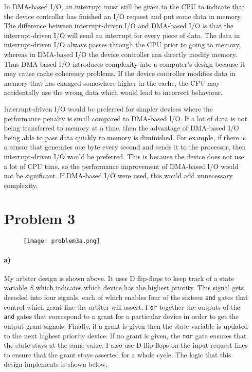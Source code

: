 \documentclass[12pt]{article}
\begin{document}
In DMA-based I/O, an interrupt must still be given to the CPU to indicate that the device controller has finished an I/O request and put some data in memory.
The difference between interrupt-driven I/O and DMA-based I/O is that the interrupt-driven I/O will send an interrupt for every piece of data. The data in
interrupt-driven I/O always passes through the CPU prior to going to memory, whereas in DMA-based I/O the device controller can directly modify memory.
Thus DMA-based I/O introduces complexity into a computer's design because it may cause cache coherency problems. If the device controller modifies data in memory
that has changed somewhere higher in the cache, the CPU may accidentally use the wrong data which would lead to incorrect behaviour.

Interrupt-driven I/O would be preferred for simpler devices where the performance penalty is small compared to DMA-based I/O. If a lot of data is not being transferred
to memory at a time, then the advantage of DMA-based I/O being able to pass data quickly to memory is diminished. For example, if there is a sensor that generates one byte
every second and sends it to the processor, then interrupt-driven I/O would be preferred. This is because the device does not use a lot of CPU time, so the performance improvement
of DMA-based I/O would not be significant. If DMA-based I/O were used, this would add unnecessary complexity.

\pagebreak

\section*{Problem 3}

\begin{figure}[!ht]
        \vspace*{-0.5cm}
        \begin{center}
                \texttt{[image: problem3a.png]}
        \end{center}
        \vspace*{-4cm}
\end{figure}

\clearpage

\paragraph{a)}

My arbiter design is shown above. It uses D flip-flops to keep track of a state variable \(S\) which indicates which device has the highest priority. This
signal gets decoded into four signals, each of which enables four of the sixteen \texttt{and} gates that control which grant line the arbiter will assert. I \texttt{or}
together the outputs of the \texttt{and} gates that correspond to a grant for a particular device in order to get the output grant signals. Finally,
if a grant is given then the state variable is updated to the next highest priority device. If no grant is given, the \texttt{nor} gate ensures that
the state stays at the same value. I also use D flip-flops on the input request lines to ensure that the grant stays asserted for a whole cycle. The logic that this design implements is shown below.
\end{document}
